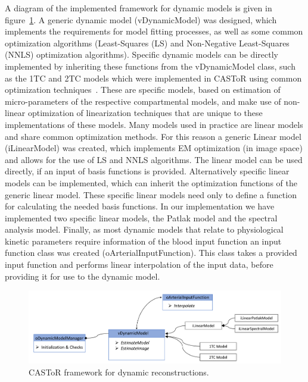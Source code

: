 A diagram of the implemented framework for dynamic models is given in figure~\ref{fig3_2:DynamicModelManager}. 
A generic dynamic model (vDynamicModel) was designed, which implements the requirements for model fitting processes, as well as some common optimization algorithms (Least-Squares (LS) and Non-Negative Least-Squares (NNLS) optimization algorithms).
Specific dynamic models can be directly implemented by inheriting these functions from the vDynamicModel class, such as the 1TC and 2TC models which were implemented in CASToR using common optimization techniques~\cite{YunZhou2001,Angelis2014}. These are specific models, based on estimation of micro-parameters of the respective compartmental models, and make use of non-linear optimization of linearization techniques that are unique to these implementations of these models. 
Many models used in practice are linear models and share common optimization methods. For this reason a generic Linear model (iLinearModel) was created, which implements EM optimization (in image space) and allows for the use of LS and NNLS algorithms. The linear model can be used directly, if an input of basis functions is provided. Alternatively specific linear models can be implemented, which can inherit the optimization functions of the generic linear model. These specific linear models need only to define a function for calculating the needed basis functions. 
In our implementation we have implemented two specific linear models, the Patlak model and the spectral analysis model. 
Finally, as most dynamic models that relate to physiological kinetic parameters require information of the blood input function an input function class was created (oArterialInputFunction). This class takes a provided input function and performs linear interpolation of the input data, before providing it for use to the dynamic model. 

\begin{figure} [ht!]
\centering
\includegraphics[scale=0.48,angle=0]{3_Results/3_2_Dynamic_Reconstruction_SimulationStudy/figures/oDynamicModelManager.pdf}
\caption{CASToR framework for dynamic reconstructions.} 
\label{fig3_2:DynamicModelManager}
\end{figure}

